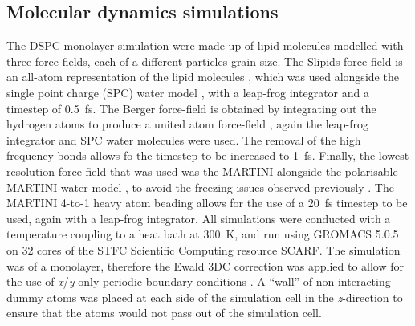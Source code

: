 \documentclass[amsmath,amssymb,twocolumn,superscriptaddress,aps,prl]{revtex4-1}
\begin{document}
\subsection{Molecular dynamics simulations}
The DSPC monolayer simulation were made up of lipid molecules modelled with three force-fields, each of a different particles grain-size.
The Slipids force-field is an all-atom representation of the lipid molecules \cite{Jambeck2012}, which was used alongside the single point charge (SPC) water model \cite{Berendsen1987}, with a leap-frog integrator and a timestep of \SI{0.5}{\femto\second}.
The Berger force-field is obtained by integrating out the hydrogen atoms to produce a united atom force-field \cite{Berger1997}, again the leap-frog integrator and SPC water molecules were used.
The removal of the high frequency  bonds allows fo the timestep to be increased to \SI{1}{\femto\second}.
Finally, the lowest resolution force-field that was used was the MARTINI \cite{Marrink2007} alongside the polarisable MARTINI water model \cite{Yesylevskyy2010}, to avoid the freezing issues observed previously \cite{Koutsioubas2016}.
The MARTINI 4-to-1 heavy atom beading allows for the use of a \SI{20}{\femto\second} timestep to be used, again with a leap-frog integrator.
All simulations were conducted with a temperature coupling to a heat bath at \SI{300}{\kelvin}, and run using GROMACS 5.0.5 \cite{Berendsen1995,Lindahl2001,vanderSpoel2005,Hess2008} on 32 cores of the STFC Scientific Computing resource SCARF.
The simulation was of a monolayer, therefore the Ewald 3DC correction was applied to allow for the use of \emph{x}/\emph{y}-only periodic boundary conditions \cite{InChul1999}.
A ``wall'' of non-interacting dummy atoms was placed at each side of the simulation cell in the \emph{z}-direction to ensure that the atoms would not pass out of the simulation cell.
\end{document}
